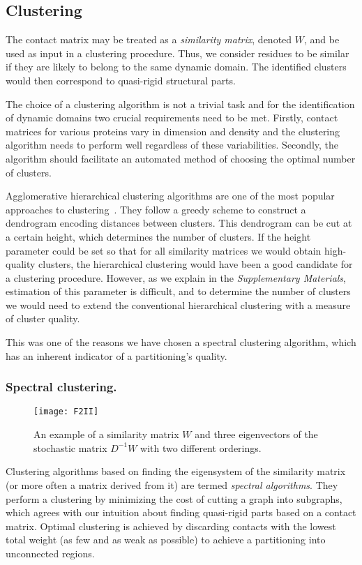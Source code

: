 \documentclass[a4paper,11pt,twoside]{book}%
\begin{document}
\subsection*{Clustering}

The contact matrix may be treated as a \emph{similarity matrix}, denoted $W$, and be used as input in a clustering procedure.
Thus, we consider residues to be similar if they are likely to belong to the same dynamic domain.
The identified clusters would then correspond to quasi-rigid structural parts.

The choice of a clustering algorithm is not a trivial task and for the identification of dynamic domains two crucial requirements need to be met.
Firstly, contact matrices for various proteins vary in dimension and density and the clustering algorithm needs to perform well regardless of these variabilities.
Secondly, the algorithm should facilitate an automated method of choosing the optimal number of clusters. 

Agglomerative hierarchical clustering algorithms are one of the most popular approaches to clustering~\cite{han2001data}.
They follow a greedy scheme to construct a dendrogram encoding distances between clusters.
This dendrogram can be cut at a certain height, which determines the number of clusters.
If the height parameter could be set so that for all similarity matrices we	 would obtain high-quality clusters, the hierarchical clustering would have been a good candidate for a clustering procedure.
However, as we explain in the \emph{Supplementary Materials}, estimation of this parameter is difficult, and to determine the number of clusters we would need to extend the conventional hierarchical clustering with a measure of cluster quality.

This was one of the reasons we have chosen a spectral clustering algorithm, which has an inherent indicator of a partitioning's quality.

\subsubsection*{Spectral clustering.}
\begin{figure}
\centering
\texttt{[image: F2II]}
\caption{
An example of a similarity matrix $W$ and three eigenvectors of the stochastic matrix $D^{-1}W$ with two different orderings.
}
\label{clustering}
\end{figure}

Clustering algorithms based on finding the eigensystem of the similarity matrix (or more often a matrix derived from it) are termed \emph{spectral algorithms}.
They perform a clustering by minimizing the cost of cutting a graph into subgraphs, which agrees with our intuition about finding quasi-rigid parts based on a contact matrix.
Optimal clustering is achieved by discarding contacts with the lowest total weight (as few and as weak as possible) to achieve a partitioning into unconnected regions.
\end{document}

